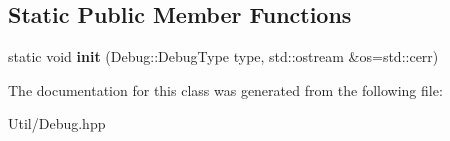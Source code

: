 \subsection*{Static Public Member Functions}
\begin{DoxyCompactItemize}
\item 
\mbox{\label{classts_1_1common_1_1_debug_a7d0f71910b5ab6aa5f00d743bdd3293d}} 
static void {\bfseries init} (Debug\+::\+Debug\+Type type, std\+::ostream \&os=std\+::cerr)
\end{DoxyCompactItemize}


The documentation for this class was generated from the following file\+:\begin{DoxyCompactItemize}
\item 
Util/Debug.\+hpp\end{DoxyCompactItemize}
